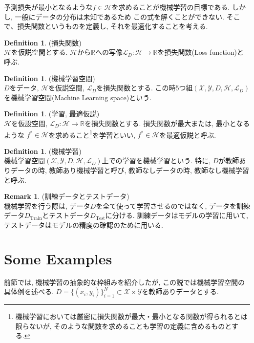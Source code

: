 \documentclass[11pt, a4paper, dvipdfmx]{jsarticle}
\theoremstyle{definition}
\newtheorem{Definition+}[Axiom+]{Definition}
\newtheorem{Remark+}[Axiom+]{Remark}
\newcommand{\R}{\mathbb{R}}
\newcommand{\X}{\mathcal{X}}
\newcommand{\Y}{\mathcal{Y}}
\newcommand{\Hil}{\mathcal{H}}
\newcommand{\Loss}{\mathcal{L}_{D}}
\newcommand{\MLsp}{(\X, \Y, D, \Hil, \Loss)}
\begin{document}
予測損失が最小となるような$f\in\Hil$を求めることが機械学習の目標である. しかし, 一般にデータの分布は未知であるため
この式を解くことができない. そこで、損失関数というものを定義し, それを最適化することを考える.
\begin{Definition+}(損失関数)\\
    $\Hil$を仮説空間とする. $\Hil$から$\R$への写像$\Loss:\Hil\to\R$を損失関数(Loss function)と呼ぶ.
\end{Definition+}
\begin{Definition+}(機械学習空間)\\
    $D$をデータ, $\Hil$を仮説空間, $\Loss$を損失関数とする. 
    この時5つ組$\MLsp$を機械学習空間(Machine Learning space)という.
\end{Definition+}
\begin{Definition+}(学習, 最適仮説)\\
    $\Hil$を仮設空間, $\Loss:\Hil\to\R$を損失関数とする. 損失関数が最大または, 最小となるような
    $f^*\in\Hil$を求めること\footnote{機械学習においては厳密に損失関数が最大・最小となる関数が得られるとは限らないが, そのような関数を求めることも学習の定義に含めるものとする. }を学習といい, $f^*\in\Hil$を最適仮説と呼ぶ.
\end{Definition+}
\begin{Definition+}(機械学習)\\
    機械学習空間$\MLsp$上での学習を機械学習という. 特に, $D$が教師ありデータの時, 教師あり機械学習と呼び, 
    教師なしデータの時, 教師なし機械学習と呼ぶ.
\end{Definition+}
\begin{Remark+}(訓練データとテストデータ)\\
    機械学習を行う際は, データ$D$を全て使って学習させるのではなく, 
    データを訓練データ$D_{\text{Train}}$とテストデータ$D_{\text{Test}}$に分ける. 
    訓練データはモデルの学習に用いて, テストデータはモデルの精度の確認のために用いる. 
\end{Remark+}
\section{Some Examples}
前節では, 機械学習の抽象的な枠組みを紹介したが, この説では機械学習空間の具体例を述べる.
$D = \{(x_i, y_i)\}_{i = 1}^{N}\subset\X\times\Y$を教師ありデータとする.
\end{document}
